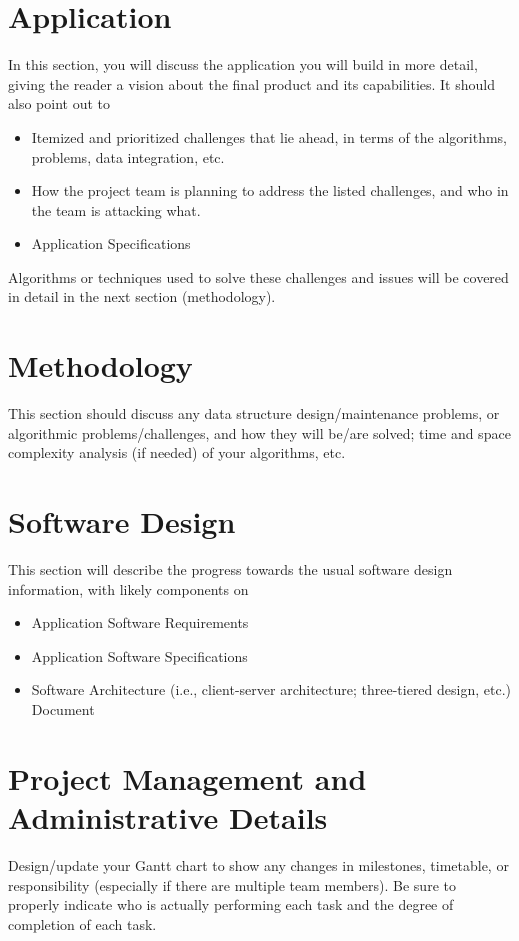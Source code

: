 \documentclass[letterpaper,12pt]{article}
\begin{document}
\section{Application}
In this section, you will discuss the application you will build in more detail,
giving the reader a vision about the final product and its capabilities. It
should also point out to
\begin{itemize}
  \item Itemized and prioritized challenges that lie ahead, in terms of the
  algorithms, problems, data integration, etc.
  \item How the project team is planning to address the listed challenges, and
  who in the team is attacking what.
  \item Application Specifications 
\end{itemize}
Algorithms or techniques used to solve these challenges and issues will be
covered in detail in the next section (methodology).
\newpage



\section{Methodology}
This section should discuss any data structure design/maintenance problems, or algorithmic 
problems/challenges, and how they will be/are solved; time and space complexity analysis (if 
needed) of your algorithms, etc. 
\newpage



\section{Software Design}
This section will describe the progress towards the usual software design information, with likely 
components on 
\begin{itemize}
  \item Application Software Requirements
  \item Application Software Specifications
  \item Software Architecture (i.e., client-server architecture; three-tiered
  design, etc.)
  \itemDesign Document
\end{itemize}
\newpage



\section{Project Management and Administrative Details}
Design/update your Gantt chart to show any changes in milestones, timetable, or
responsibility (especially if there are multiple team members). Be sure to
properly indicate who is actually performing each task and the degree of
completion of each task.
\end{document}
